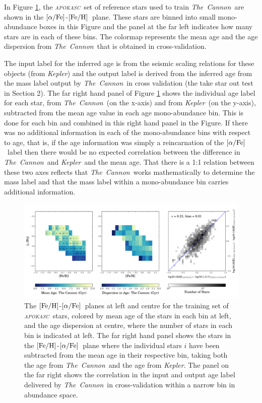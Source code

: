 \documentclass[12pt, preprint]{aastex}
\newcommand{\project}[1]{\textsl{#1}}
\newcommand{\tc}{\project{The~Cannon}}
\newcommand{\apokasc}{\project{\textsc{apokasc}}}
\newcommand{\kepler}{\project{Kepler}}
\newcommand{\feh}{\mbox{$\rm [Fe/H]$}}
\newcommand{\alphafe}{\mbox{$\rm [\alpha/Fe]$}}
\begin{document}
In Figure \ref{fig:alphabins}, the \apokasc\ set of reference stars used to train \tc\ are shown in the \alphafe-\feh\ plane. These stars are binned into small mono-abundance boxes in this Figure and the panel at the far left indicates how many stars are in each of these bins. The colormap represents the mean age and the age dispersion from \tc\ that is obtained in cross-validation.

The input label for the inferred age is from the seismic scaling relations for these objects (from \kepler) and the output label is derived from the inferred age from the mass label output by \tc\ in cross validation (the take star out test in Section 2). The far right hand panel of Figure \ref{fig:alphabins} shows the individual age label for each star, from \tc\ (on the x-axis) and from \kepler\ (on the y-axis), subtracted from the mean age value in each age mono-abundance bin. This is done for each bin and combined in this right hand panel in the Figure. If there was no additional information in each of the mono-abundance bins with respect to age, that is, if the age information was simply a reincarnation of the \alphafe\ label then there would be no expected correlation between the difference in \tc\ and \kepler\ and the mean age. That there is a 1:1 relation between these two axes reflects that \tc\ works mathematically to determine the mass label and that the mass label within a mono-abundance bin carries additional information.

\begin{figure}[p]
\centering
  \includegraphics[scale=0.4]{./plots/alpha_feh_rc2.pdf}
    \caption{The \feh-\alphafe\ planes at left and centre for the training set of \apokasc\ stars, colored by mean age of the stars in each bin at left,  and the age dispersion at centre, where the number of stars in each bin is indicated at left. The far right hand panel shows the stars in the \feh-\alphafe\ plane where the individual stars $i$ have been subtracted from the mean age in their respective bin, taking both the age from \tc\ and the age from \kepler. The panel on the far right shows the correlation in the input and output age label delivered by \tc\ in cross-validation within a narrow bin in abundance space.  }
\label{fig:alphabins}
\end{figure}
\end{document}
